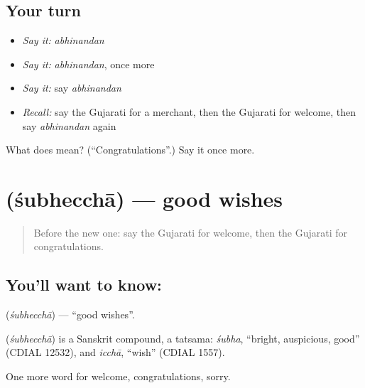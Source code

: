 \subsection*{Your turn}
\begin{itemize}
\raggedright
  \item \emph{Say it:} \emph{abhinandan}
  \item \emph{Say it:} \emph{abhinandan}, once more
  \item \emph{Say it:} say \emph{abhinandan}
  \item \emph{Recall:} say the Gujarati for a merchant, then the Gujarati for welcome, then say \emph{abhinandan} again
\end{itemize}

\begin{tcolorbox}[breakable,colback=teal!4,colframe=teal!35!black,title={Before you move on}]
What does  mean? (\textquotedblleft{}Congratulations\textquotedblright{}.) Say it once more.
\end{tcolorbox}
\section[\texorpdfstring{\gu{શુભેચ્છા} (śubhecchā)}{શુભેચ્છા (śubhecchā)}]{ (śubhecchā) — good wishes}

\label{lesson:GU-C91-goodwishes}



\begin{quote}
Before the new one: say the Gujarati for welcome, then the Gujarati for congratulations.
\end{quote}

\subsection*{You'll want to know: }
\textbf{} (\emph{śubhecchā}) — \textquotedblleft{}good wishes\textquotedblright{}.

\begin{cousinweb}
\textbf{} (\emph{śubhecchā}) is a Sanskrit compound, a tatsama: \emph{śubha}, \textquotedblleft{}bright, auspicious, good\textquotedblright{} (CDIAL 12532), and \emph{icchā}, \textquotedblleft{}wish\textquotedblright{} (CDIAL 1557).
\end{cousinweb}

\begin{grammarlens}[title={What you've built}]
One more word for welcome, congratulations, sorry.
\end{grammarlens}

